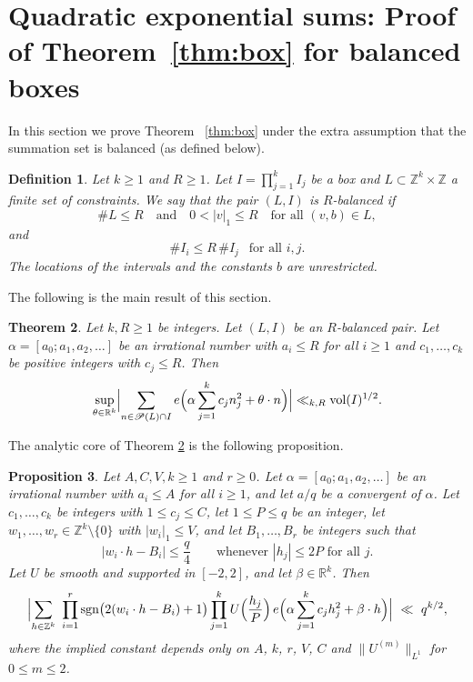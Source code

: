 \documentclass[a4paper,reqno,12pt]{amsart}
\theoremstyle{plain}
\newtheorem{theorem}{Theorem}
\newtheorem{proposition}[theorem]{Proposition}
\theoremstyle{plain}
\newtheorem{definition}[theorem]{Definition}
\theoremstyle{remark}
\theoremstyle{plain}
\newcommand{\cP}{\mathscr{P}}
\newcommand{\RR}{\mathbb{R}}
\newcommand{\Z}{\mathbb{Z}}
\newcommand{\vol}{\operatorname{vol}}
\theoremstyle{plain}
\theoremstyle{plain}
\begin{document}
{\section{Quadratic exponential sums: Proof of Theorem~\ref{thm:box} for balanced boxes}\label{sec:quadratic}


In this section we prove Theorem ~\ref{thm:box} under the extra assumption that the {summation set} is balanced (as defined below).
 
\begin{definition}\label{def:balanced}
Let $k\geq1$ and $R\ge1$. Let $I=\prod_{j=1}^kI_j$ be a box and
$L\subset\Z^k\times\Z$ a finite set of constraints. We say that the pair
$(L,I)$ is \emph{$R$-balanced} if
\[
 {\#L\le R \quad \text{and} \quad 0<|v|_1\le R \quad \text{for all }(v,b)\in L},
\]
and
\[
 \#I_i\le R\,\#I_j\ \ \text{ for all } i,j{.}
\]
The locations of the intervals and the constants $b$ are unrestricted. 
\end{definition} 
 
The following is the main result of this section.

\begin{theorem}\label{thm:general}
Let $k,R\geq1$ be integers. Let $(L,I)$ be an $R$-balanced pair.  Let $\alpha = [a_0; a_1, a_2, \ldots]$ 
be an irrational number with $a_i \leq R$ for all $i \geq 1$
and $c_1,{\ldots},c_k$ be positive integers with
$c_j\le R$.  Then
\[
\sup_{\theta\in\mathbb R^k} \Bigl|\sum_{n\in \cP(L) \cap I}e\Bigl(\alpha\sum_{j=1}^kc_jn_j^2
 +\theta\cdot n\Bigr)\Bigr|\ll_{k,R}\vol(I)^{1/2}.
\]
\end{theorem} 

The analytic core of Theorem \ref{thm:general} is the following proposition.
 
\begin{proposition}\label{prop:multiwall}
Let $A, C, V, k \geq 1$ and $r \geq 0$.
Let $\alpha = [a_0; a_1, a_2, \ldots]$ be an irrational number with
$a_i \leq A$ for all $i \geq 1$, and let $a/q$ be a convergent of
$\alpha$. Let $c_1,{\ldots},c_k$ be integers with $1\le c_j\le C$, let
$1 \leq P \leq q$ be an integer, let $w_1,{\ldots},w_r\in\Z^k\setminus\{0\}$ with
$|w_i|_1\le V$, and let $B_1,{\ldots},B_r$ be integers such that
\[
|w_i\cdot h-B_i|\le\frac q4
\qquad\text{whenever } |h_j|\le2P \text{ for all } j.
\]
Let $U$ be smooth and supported in $[-2,2]$, and let
$\beta\in\RR^k$. Then
\[
\Bigl|\sum_{h\in\mathbb Z^k}\ \prod_{i=1}^r
\operatorname{sgn}\bigl(2(w_i\cdot h-B_i)+1\bigr)
\prod_{j=1}^kU\Bigl(\frac{h_j}P\Bigr)\,
e\Bigl(\alpha\sum_{j=1}^kc_jh_j^2+\beta\cdot h\Bigr)\Bigr|
\ \ll\ q^{k/2},
\]
where the implied constant depends only on $A$, $k$, $r$, $V$, $C$ and
$\|U^{(m)}\|_{L^1}$ for $0\le m\le2$.


\end{proposition}}
\end{document}
